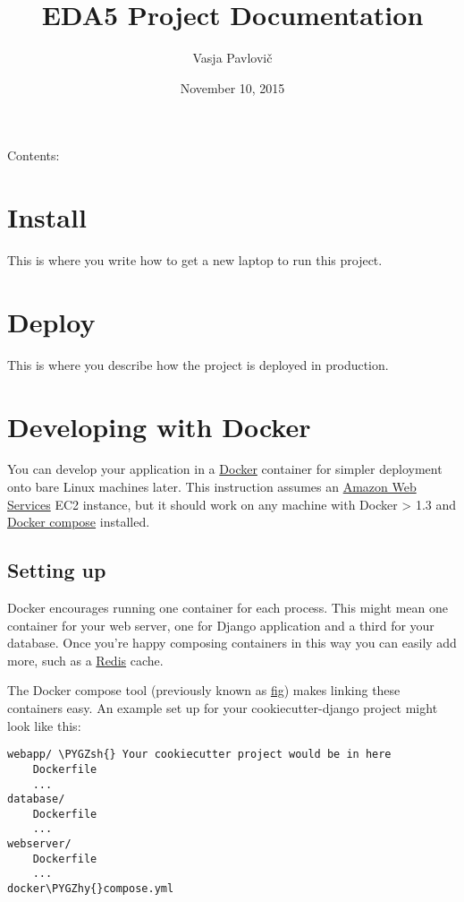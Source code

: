 \documentclass[letterpaper,10pt,english]{sphinxmanual}
\title{EDA5 Project Documentation}
\date{November 10, 2015}
\author{Vasja Pavlovič}
\def\PYGZsh{\char`\#}
\def\PYGZhy{\char`\-}
\begin{document}
\maketitle
\tableofcontents
{}\label{index::doc}


Contents:


\chapter{Install}
\label{install:welcome-to-eda5-project-s-documentation}\label{install:install}\label{install::doc}
This is where you write how to get a new laptop to run this project.


\chapter{Deploy}
\label{deploy::doc}\label{deploy:deploy}
This is where you describe how the project is deployed in production.


\chapter{Developing with Docker}
\label{docker_ec2::doc}\label{docker_ec2:developing-with-docker}
You can develop your application in a \href{https://www.docker.com/}{Docker} container for simpler deployment onto bare Linux machines later. This instruction assumes an \href{http://aws.amazon.com/}{Amazon Web Services} EC2 instance, but it should work on any machine with Docker \textgreater{} 1.3 and \href{https://docs.docker.com/compose/}{Docker compose} installed.


\section{Setting up}
\label{docker_ec2:docker-compose}\label{docker_ec2:setting-up}
Docker encourages running one container for each process. This might mean one container for your web server, one for Django application and a third for your database. Once you're happy composing containers in this way you can easily add more, such as a \href{http://redis.io/}{Redis} cache.

The Docker compose tool (previously known as \href{http://www.fig.sh/}{fig}) makes linking these containers easy. An example set up for your cookiecutter-django project might look like this:

\begin{Verbatim}[commandchars=\\\{\}]
webapp/ \PYGZsh{} Your cookiecutter project would be in here
    Dockerfile
    ...
database/
    Dockerfile
    ...
webserver/
    Dockerfile
    ...
docker\PYGZhy{}compose.yml
\end{Verbatim}
\end{document}
